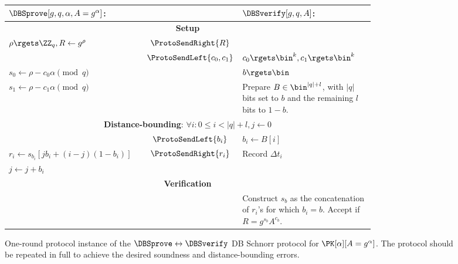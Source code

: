 \begin{figure*}
  \centering
  \small
  \setlength{\ProtoArrowLength}{0.07\linewidth}
  \begin{tabular}{p{0.40\linewidth}cp{0.40\linewidth}}
    \(\DBSprove[g, q, \alpha, A = g^\alpha]\):
    & &
    \(\DBSverify[g, q, A]\):
    \\
    \midrule

    \multicolumn{3}{c}{\textbf{Setup}} \\

    \(\rho\rgets \ZZ_q, R\gets g^{\rho}\)
    & \(\ProtoSendRight{R}\)
    &
    \\

    & \(\ProtoSendLeft{c_0, c_1}\)
    & \(c_0\rgets \bin^k, c_1\rgets \bin^k\)
    \\

    \(s_0\gets \rho - c_0\alpha \pmod q\)
    &
    & \(b\rgets \bin\)
    \\

    \(s_1\gets \rho - c_1\alpha \pmod q\)
    &
    & Prepare \(B\in \bin^{|q|+l}\), with \(|q|\) bits set to \(b\) and the 
    remaining \(l\) bits to \(1-b\).
    \\

    \midrule
    \multicolumn{3}{c}{\textbf{Distance-bounding}: \(\forall i: 0\leq i < |q| + 
        l, j\gets 0\)} \\


    & \(\ProtoSendLeft{b_i}\)
    & \(b_i\gets B[i]\)
    \\

    \(r_i\gets s_{b_i}[jb_i + (i-j)(1-b_i)]\)
    & \(\ProtoSendRight{r_i}\)
    & Record \(\Delta t_i\)
    \\

    \(j \gets j + b_i\)
    &
    &
    \\

    \midrule
    \multicolumn{3}{c}{\textbf{Verification}}
    \\

    &
    & Construct \(s_b\) as the concatenation of \(r_i\)'s for which \(b_i = 
      b\).
      Accept if \(R = g^{s_b} A^{c_b}\).
    \\
    
  \end{tabular}
  \caption{%
    One-round protocol instance of the \(\DBSprove\leftrightarrow \DBSverify\) \ac{DB} Schnorr protocol for \(\PK[\alpha][A = g^\alpha]\).
    The protocol should be repeated in full to achieve the desired soundness 
    and distance-bounding errors.
  }%
  \label{SchnorrFigure}
\end{figure*}

